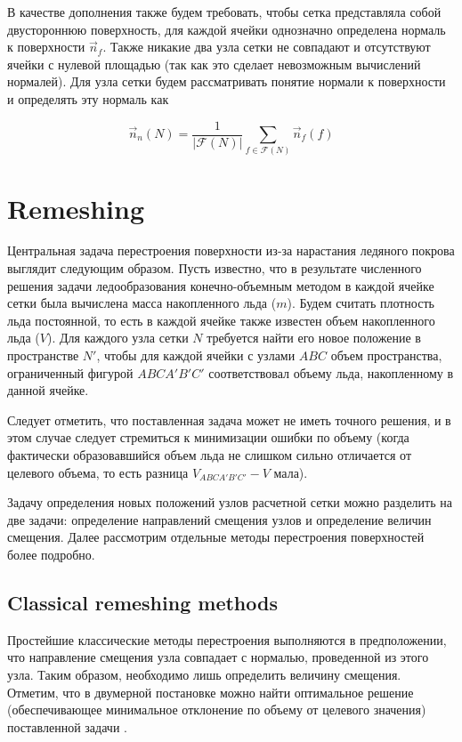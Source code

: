 \documentclass[
11pt,%
tightenlines,%
twoside,%
onecolumn,%
nofloats,%
nobibnotes,%
nofootinbib,%
superscriptaddress,%
noshowpacs,%
centertags]%
{revtex4}
\begin{document}
В качестве дополнения также будем требовать, чтобы сетка представляла собой двустороннюю поверхность, для каждой ячейки однозначно определена нормаль к поверхности $\vec{n}_f$.
Также никакие два узла сетки не совпадают и отсутствуют ячейки с нулевой площадью (так как это сделает невозможным вычислений нормалей).
Для узла сетки будем рассматривать понятие нормали к поверхности и определять эту нормаль как

\begin{equation}
\vec{n}_n(N) = \frac{1}{|\mathscr{F}(N)|} \sum_{f \in \mathscr{F}(N)}{\vec{n}_f(f)}
\end{equation}


\section{Remeshing}

Центральная задача перестроения поверхности из-за нарастания ледяного покрова выглядит следующим образом.
Пусть известно, что в результате численного решения задачи ледообразования конечно-объемным методом \cite{Beaugendre} в каждой ячейке сетки была вычислена масса накопленного льда ($m$).
Будем считать плотность льда постоянной, то есть в каждой ячейке также известен объем накопленного льда ($V$).
Для каждого узла сетки $N$ требуется найти его новое положение в пространстве $N'$, чтобы для каждой ячейки с узлами $ABC$ объем пространства, ограниченный фигурой $ABCA'B'C'$ соответствовал объему льда, накопленному в данной ячейке.

Следует отметить, что поставленная задача может не иметь точного решения, и в этом случае следует стремиться к минимизации ошибки по объему (когда фактически образовавшийся объем льда не слишком сильно отличается от целевого объема, то есть разница $V_{ABCA'B'C'} - V$ мала).

Задачу определения новых положений узлов расчетной сетки можно разделить на две задачи: определение направлений смещения узлов и определение величин смещения.
Далее рассмотрим отдельные методы перестроения поверхностей более подробно.

\subsection{Classical remeshing methods}

Простейшие классические методы перестроения выполняются в предположении, что направление смещения узла совпадает с нормалью, проведенной из этого узла.
Таким образом, необходимо лишь определить величину смещения.
Отметим, что в двумерной постановке можно найти оптимальное решение (обеспечивающее минимальное отклонение по объему от целевого значения) поставленной задачи \cite{Rybakov_2D}.
\end{document}
